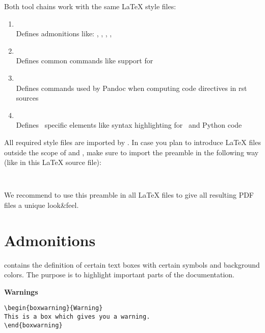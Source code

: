 \documentclass[a4paper,10pt]{report}
\begin{document}
Both tool chains work with the same LaTeX style files:

\begin{enumerate}

   \item {}\\
      Defines admonitions like: , , , , 

   \item {}\\
      Defines common commands like support for 

   \item {}\\
      Defines commands used by Pandoc when computing code directives in rst sources

   \item {}\\
      Defines \rfw\ specific elements like syntax highlighting for \rfwcore\ and Python code

\end{enumerate}

All required style files are imported by . In case you plan to introduce LaTeX files outside the scope of
 and , make sure to import the preamble in the following way (like in this LaTeX source file):

\begin{verbatim}
   
\end{verbatim}

We recommend to use this preamble in all LaTeX files to give all resulting PDF files a unique look\&feel.


\chapter{Admonitions}

 contains the definition of certain text boxes with certain symbols and background colors. The purpose is to highlight
important parts of the documentation.

\vspace{2ex}

\textbf{Warnings}
\begin{verbatim}
\begin{boxwarning}{Warning}
This is a box which gives you a warning.
\end{boxwarning}
\end{verbatim}
\end{document}
